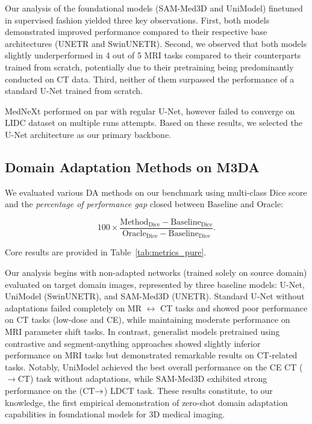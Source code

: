 Our analysis of the foundational models (SAM-Med3D and UniModel) finetuned in supervised fashion yielded three key observations. First, both models demonstrated improved performance compared to their respective base architectures (UNETR and SwinUNETR). Second, we observed that both models slightly underperformed in 4 out of 5 MRI tasks compared to their counterparts trained from scratch, potentially due to their pretraining being predominantly conducted on CT data. Third, neither of them surpassed the performance of a standard U-Net trained from scratch.

MedNeXt performed on par with regular U-Net, however failed to converge on LIDC dataset on multiple runs attempts. %
Based on these results, we selected the U-Net architecture as our primary backbone.


\subsection{Domain Adaptation Methods on M3DA}



We evaluated various DA methods on our benchmark using multi-class Dice score and the \textit{percentage of performance gap} closed between Baseline and Oracle: 

\[
100\times \frac{\text{Method}_{\text{Dice}} - \text{Baseline}_{\text{Dice}}}{\text{Oracle}_{\text{Dice}} - \text{Baseline}_{\text{Dice}}}.
\]

Core results are provided in Table~\ref{tab:metrics_pure}.

%


Our analysis begins with non-adapted networks (trained solely on source domain) evaluated on target domain images, represented by three baseline models: U-Net, UniModel (SwinUNETR), and SAM-Med3D (UNETR). Standard U-Net without adaptations failed completely on MR $\leftrightarrow$ CT tasks and showed poor performance on CT tasks (low-dose and CE), while maintaining moderate performance on MRI parameter shift tasks. In contrast, generalist models pretrained using contrastive and segment-anything approaches showed slightly inferior performance on MRI tasks but demonstrated remarkable results on CT-related tasks. Notably, UniModel achieved the best overall performance on the CE CT ($\rightarrow$CT) task without adaptations, while SAM-Med3D exhibited strong performance on the (CT$\rightarrow$) LDCT task. These results constitute, to our knowledge, the first empirical demonstration of zero-shot domain adaptation capabilities in foundational models for 3D medical imaging.

